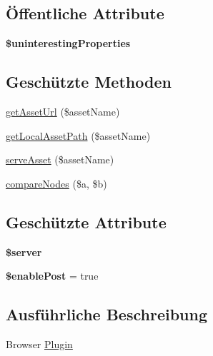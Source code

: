 \subsection*{Öffentliche Attribute}
\begin{DoxyCompactItemize}
\item 
{\bfseries \$uninteresting\+Properties}
\end{DoxyCompactItemize}
\subsection*{Geschützte Methoden}
\begin{DoxyCompactItemize}
\item 
\mbox{\hyperlink{class_sabre_1_1_d_a_v_1_1_browser_1_1_plugin_a1781a868b994e21cfeeed0ab8ced5510}{get\+Asset\+Url}} (\$asset\+Name)
\item 
\mbox{\hyperlink{class_sabre_1_1_d_a_v_1_1_browser_1_1_plugin_a0de3e35c355e0a707e9adf35dca05273}{get\+Local\+Asset\+Path}} (\$asset\+Name)
\item 
\mbox{\hyperlink{class_sabre_1_1_d_a_v_1_1_browser_1_1_plugin_a58aabbc6d9655d9ea0a4ef348e1ae6d1}{serve\+Asset}} (\$asset\+Name)
\item 
\mbox{\hyperlink{class_sabre_1_1_d_a_v_1_1_browser_1_1_plugin_a7c02ba08a7b93231308fb21b699c394b}{compare\+Nodes}} (\$a, \$b)
\end{DoxyCompactItemize}
\subsection*{Geschützte Attribute}
\begin{DoxyCompactItemize}
\item 
\mbox{\label{class_sabre_1_1_d_a_v_1_1_browser_1_1_plugin_af20c6bf2796c453cb4be988db973e0d4}} 
{\bfseries \$server}
\item 
\mbox{\label{class_sabre_1_1_d_a_v_1_1_browser_1_1_plugin_aa037404152726206d088c07d0429a47e}} 
{\bfseries \$enable\+Post} = true
\end{DoxyCompactItemize}


\subsection{Ausführliche Beschreibung}
Browser \mbox{\hyperlink{class_sabre_1_1_d_a_v_1_1_browser_1_1_plugin}{Plugin}}

